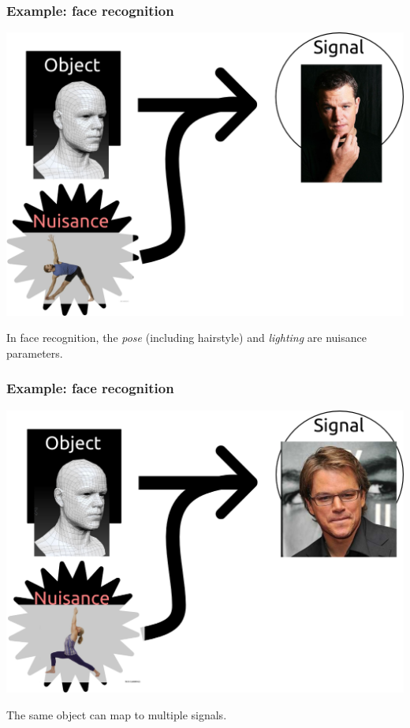 \documentclass{beamer}
\begin{document}
\begin{frame}
\frametitle{Example: face recognition}
\begin{center}
\includegraphics[scale = 0.2]{defense_diagrams/face_2a.png}
\end{center}
In face recognition, the \emph{pose} (including hairstyle) and \emph{lighting} are nuisance parameters.
\end{frame}

\begin{frame}
\frametitle{Example: face recognition}
\begin{center}
\includegraphics[scale = 0.2]{defense_diagrams/face_2b.png}
\end{center}
The same object can map to multiple signals.
\end{frame}
\end{document}
